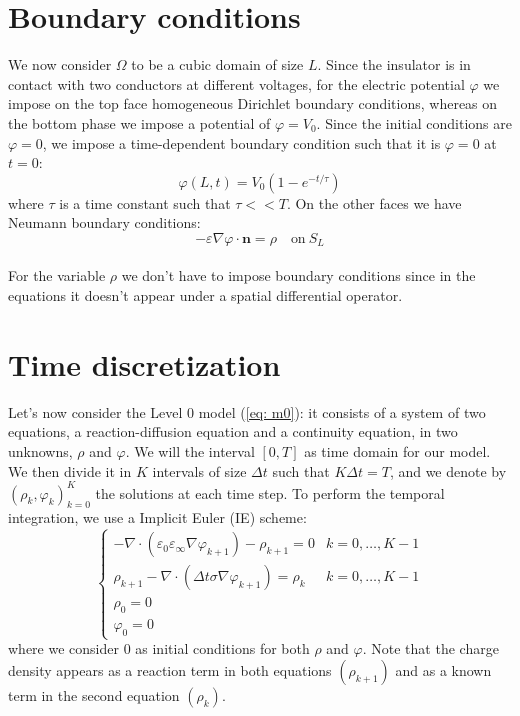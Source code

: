 \documentclass{Configuration_Files/PoliMi3i_thesis}
\let\phi\varphi
\let\epsilon\varepsilon
\begin{document}
\section{Boundary conditions}
We now consider $\Omega$ to be a cubic domain of size $L$. Since the insulator is in contact with two conductors at different voltages, for the electric potential $\phi$ we impose on the top face homogeneous Dirichlet boundary conditions, whereas on the bottom phase we impose a potential of $\phi=V_0$. Since the initial conditions are $\phi=0$, we impose a time-dependent boundary condition such that it is $\phi=0$ at $t=0$:
\begin{equation}
    \phi(L,t)=V_0\left(1-e^{-t/\tau}\right)
    \label{eq: bc}
\end{equation}
where $\tau$ is a time constant such that $\tau<<T$. On the other faces we have Neumann boundary conditions:
\begin{equation}
    -\epsilon\nabla\phi\cdot\bm{n}=\rho\quad \text{on}\ S_L
    \label{eq: bc N}
\end{equation}
\\For the variable $\rho$ we don't have to impose boundary conditions since in the equations it doesn't appear under a spatial differential operator.

\section{Time discretization}
Let's now consider the Level 0 model (\ref{eq: m0}): it consists of a system of two equations, a reaction-diffusion equation and a continuity equation, in two unknowns, $\rho$ and $\phi$. We will the interval $[0,T]$ as time domain for our model.
\\We then divide it in $K$ intervals of size $\Delta t$ such that $K\Delta t=T$, and we denote by $(\rho_k,\phi_k)_{k=0}^K$ the solutions at each time step. To perform the temporal integration, we use a Implicit Euler (IE) scheme:
\begin{equation}
    \begin{cases}
    -\nabla\cdot(\epsilon_0\epsilon_\infty\nabla\phi_{k+1})-\rho_{k+1}=0 & k=0,\dots,K-1\\
    \rho_{k+1}-\nabla\cdot(\Delta t\sigma\nabla\phi_{k+1})=\rho_k & k=0,\dots,K-1\\
    \rho_0=0\\
    \phi_0=0
    \end{cases}
    \label{eq: m0 time}
\end{equation}
where we consider $0$ as initial conditions for both $\rho$ and $\phi$. Note that the charge density appears as a reaction term in both equations $(\rho_{k+1})$ and as a known term in the second equation $(\rho_k)$.
\end{document}
